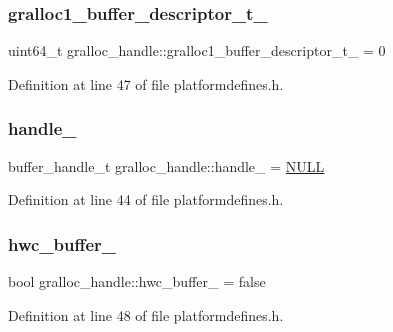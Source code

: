\subsubsection{\texorpdfstring{gralloc1\+\_\+buffer\+\_\+descriptor\+\_\+t\+\_\+}{gralloc1\_buffer\_descriptor\_t\_}}
{\footnotesize\ttfamily uint64\+\_\+t gralloc\+\_\+handle\+::gralloc1\+\_\+buffer\+\_\+descriptor\+\_\+t\+\_\+ = 0}



Definition at line 47 of file platformdefines.\+h.

\mbox{\label{structgralloc__handle_a7ab2601be21b021ab2a14d6549c6a537}} 
\subsubsection{\texorpdfstring{handle\+\_\+}{handle\_}}
{\footnotesize\ttfamily buffer\+\_\+handle\+\_\+t gralloc\+\_\+handle\+::handle\+\_\+ = \mbox{\hyperlink{alios_2platformdefines_8h_a070d2ce7b6bb7e5c05602aa8c308d0c4}{N\+U\+LL}}}



Definition at line 44 of file platformdefines.\+h.

\mbox{\label{structgralloc__handle_a3ed360c5ac62fea5f6e171371ba6bb2a}} 
\subsubsection{\texorpdfstring{hwc\+\_\+buffer\+\_\+}{hwc\_buffer\_}}
{\footnotesize\ttfamily bool gralloc\+\_\+handle\+::hwc\+\_\+buffer\+\_\+ = false}



Definition at line 48 of file platformdefines.\+h.

\mbox{\label{structgralloc__handle_a6164b11702467313a0276cd7f823696a}} 
